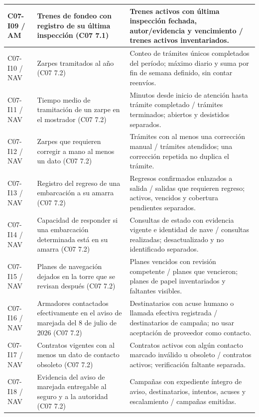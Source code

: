 \begin{longtable}{@{}L{.12\linewidth}L{.32\linewidth}L{\dimexpr.56\tabcolsep\relax}@{}}
C07-I09 / AM & Trenes de fondeo con registro de su última inspección (C07 7.1) & Trenes activos con última inspección fechada, autor/\allowbreak{}evidencia y vencimiento /\allowbreak{} trenes activos inventariados. \\ \hline
C07-I10 / NAV & Zarpes tramitados al año (C07 7.2) & Conteo de trámites únicos completados del período; máximo diario y suma por fin de semana definido, sin contar reenvíos. \\ \hline
C07-I11 / NAV & Tiempo medio de tramitación de un zarpe en el mostrador (C07 7.2) & Minutos desde inicio de atención hasta trámite completado /\allowbreak{} trámites terminados; abiertos y desistidos separados. \\ \hline
C07-I12 / NAV & Zarpes que requieren corregir a mano al menos un dato (C07 7.2) & Trámites con al menos una corrección manual /\allowbreak{} trámites atendidos; una corrección repetida no duplica el trámite. \\ \hline
C07-I13 / NAV & Registro del regreso de una embarcación a su amarra (C07 7.2) & Regresos confirmados enlazados a salida /\allowbreak{} salidas que requieren regreso; activos, vencidos y cobertura pendientes separados. \\ \hline
C07-I14 / NAV & Capacidad de responder si una embarcación determinada está en su amarra (C07 7.2) & Consultas de estado con evidencia vigente e identidad de nave /\allowbreak{} consultas realizadas; desactualizado y no identificado separados. \\ \hline
C07-I15 / NAV & Planes de navegación dejados en la torre que se revisan después (C07 7.2) & Planes vencidos con revisión competente /\allowbreak{} planes que vencieron; planes de papel inventariados y faltantes visibles. \\ \hline
C07-I16 / NAV & Armadores contactados efectivamente en el aviso de marejada del 8 de julio de 2026 (C07 7.2) & Destinatarios con acuse humano o llamada efectiva registrada /\allowbreak{} destinatarios de campaña; no usar aceptación de proveedor como contacto. \\ \hline
C07-I17 / NAV & Contratos vigentes con al menos un dato de contacto obsoleto (C07 7.2) & Contratos activos con algún contacto marcado inválido u obsoleto /\allowbreak{} contratos activos; verificación faltante separada. \\ \hline
C07-I18 / NAV & Evidencia del aviso de marejada entregable al seguro y a la autoridad (C07 7.2) & Campañas con expediente íntegro de aviso, destinatarios, intentos, acuses y escalamiento /\allowbreak{} campañas emitidas. \\ \hline

\end{longtable}
